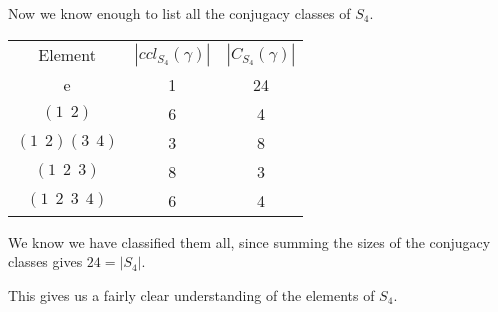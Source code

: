 \documentclass[../Main.tex]{subfiles}
\begin{document}
\begin{example}
    Now we know enough to list all the conjugacy classes of $S_4$.\par
    \begin{tabular}{c|c|c}
        Element & $|ccl_{S_4}(\gamma)|$ & $|C_{S_4}(\gamma)|$ \\
        e & 1 & 24 \\
        \hline
        $(1~~2)$ & 6 & 4 \\
        $(1~~2)(3~~4)$ & 3 & 8 \\
        $(1~~2~~3)$ & 8 & 3 \\
        $(1~~2~~3~~4)$ & 6 & 4 
    \end{tabular}\par
    We know we have classified them all, since summing the sizes of the conjugacy classes gives $24 = |S_4|$.\par
    This gives us a fairly clear understanding of the elements of $S_4$.
\end{example}
\end{document}
